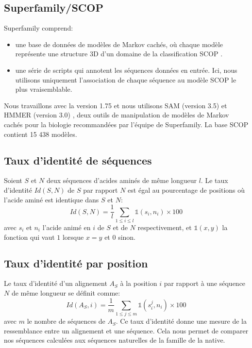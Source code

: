 \subsection{Superfamily/SCOP}
\label{sec:Superfamily}
Superfamily \cite{Madera04} comprend: 
\begin{itemize}
\item une base de données de modèles de Markov cachés, où chaque modèle représente une structure 3D d'un domaine de la classification SCOP \cite{Andreeva04}.
\item une série de scripts qui annotent les séquences données en entrée. Ici, nous utilisons uniquement l'association de chaque séquence au modèle SCOP le plus vraisemblable. 
\end{itemize}
Nous travaillons avec la version 1.75 et nous utilisons SAM (version 3.5) \cite{hughey95} et HMMER (version 3.0) \cite{HMMER}, deux outils de manipulation de modèles de Markov cachés pour la biologie recommandées par l'équipe de Superfamily. La base SCOP contient 15 438 modèles.

\subsection{Taux d'identité de séquences}

Soient $S$ et $N$ deux séquences d'acides aminés de même longueur $l$. Le taux d'identité $Id(S,N)$ de $S$ par rapport $N$ est égal au pourcentage de positions où l'acide aminé est identique dans $S$ et $N$:
\begin{equation}
Id(S,N) =\frac{1}{l}\sum_{1 \leqslant i \leqslant l} \mathds{1}(s_i,n_i) \times 100
\end{equation}
avec $s_i$ et $n_i$ l'acide animé en $i$ de $S$ et de $N$ respectivement, et $\mathds{1}(x,y)$ la fonction qui vaut $1$ lorsque $x=y$ et $0$ sinon. 
\subsection{Taux d'identité par position}
\label{TauxID}
Le taux d'identité d'un alignement $A_S$ à la position $i$ par rapport à une séquence $N$ de même longueur se définit comme:
\begin{equation}
Id(A_{S},i) = \frac{1}{m}\sum_{1\leqslant j \leqslant m} \mathds{1}(s_i^j,n_i) \times 100
\end{equation}
avec $m$ le nombre de séquences de $A_S$. Ce taux d'identité donne une mesure de la ressemblance entre un alignement et une séquence. Cela nous permet de comparer nos séquences calculées aux séquences naturelles de la famille de la native.  
